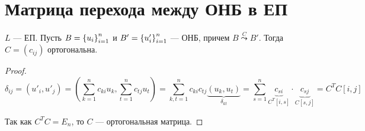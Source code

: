 \section{Матрица перехода между ОНБ в ЕП}

\begin{thm*}
    $L$ --- ЕП. Пусть $B = \left\{u_i\right\}_{i=1}^{n}$ и $B' = \left\{u'_i\right\}_{i=1}^{n}$ --- ОНБ, причем $B \stackrel{C}{\leadsto} B'$. Тогда $C = (c_{ij})$ ортогональна.
\end{thm*}

\begin{proof}
    $$\delta_{ij} = (u'_i, u'_j) = \left(\sum_{k=1}^n c_{ki} u_k, \sum_{t=1}^n c_{tj} u_t\right) = \sum_{k,t=1}^n c_{ki} c_{tj} \underbrace{(u_k, u_t)}_{\delta_{kt}} = \sum_{s=1}^n \underbrace{c_{si}}_{C^T[i, s]} \cdot \underbrace{c_{sj}}_{C[s, j]} = C^T C[i, j]$$
    
    Так как $C^T C = E_n$, то $C$ --- ортогональная матрица.
\end{proof}